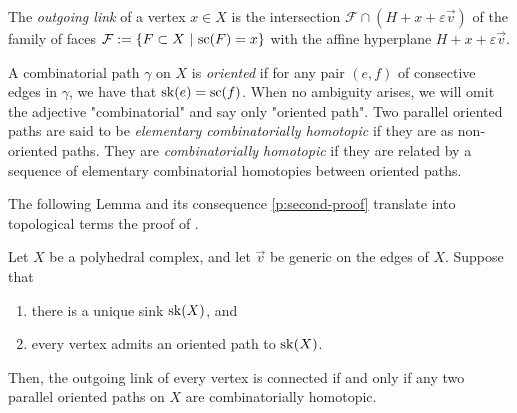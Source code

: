 \begin{definition}
    The \emph{outgoing link} of a vertex $x \in X$ is the intersection $\mathcal{F} \cap (H+x+\varepsilon \vec v)$ of the family of faces $\mathcal{F}:=\{ F \subset X \ | \ \mathrm{sc}(F)=x \}$ with the affine hyperplane $H+x+\varepsilon \vec v$. 
\end{definition}

A combinatorial path $\gamma$ on $X$ is \emph{oriented} if for any pair $(e, f)$ of consective edges in $\gamma$, we have that $\mathrm{sk}(e)=\mathrm{sc}(f)$.  
When no ambiguity arises, we will omit the adjective "combinatorial" and say only "oriented path".
Two parallel oriented paths are said to be \emph{elementary combinatorially homotopic} if they are as non-oriented paths. 
They are \emph{combinatorially homotopic} if they are related by a sequence of elementary combinatorial homotopies between oriented paths. 

The following Lemma and its consequence \cref{p:second-proof} translate into topological terms the proof of \cite[Theorem 3.1]{MacLane63}.

\begin{lemma}
\label{l:oriented}
    Let $X$ be a polyhedral complex, and let $\vec v$ be generic on the edges of $X$.
    Suppose that 
    \begin{enumerate}[label=\roman*)]
        \item there is a unique sink $\mathrm{sk}(X)$, and
        \item every vertex admits an oriented path to $\mathrm{sk}(X)$.
    \end{enumerate}
    Then, the outgoing link of every vertex is connected if and only if any two parallel oriented paths on $X$ are combinatorially homotopic.
\end{lemma}

